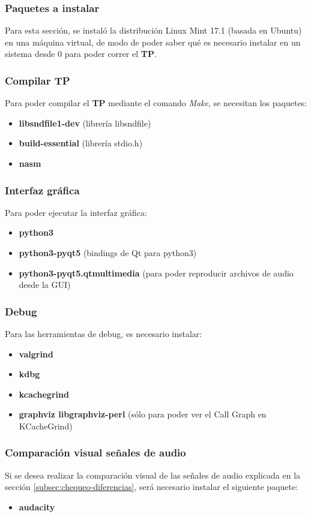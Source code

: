\subsubsection{Paquetes a instalar}
\label{subsec:instalar}
Para esta sección, se instaló la distribución Linux Mint 17.1 (basada en Ubuntu) en una máquina virtual, de modo de poder saber qué es necesario instalar en un sistema desde 0 para poder correr el \textbf{TP}.

\subsubsection*{Compilar TP}
Para poder compilar el \textbf{TP} mediante el comando \textit{Make}, se necesitan los paquetes: 
\begin{itemize}
 \item \textbf{libsndfile1-dev} (librería libsndfile)
 \item \textbf{build-essential} (librería stdio.h)
 \item \textbf{nasm}
\end{itemize}

\subsubsection*{Interfaz gráfica}
Para poder ejecutar la interfaz gráfica:
\begin{itemize}
 \item \textbf{python3}
 \item \textbf{python3-pyqt5} (bindings de Qt para python3)
 \item \textbf{python3-pyqt5.qtmultimedia} (para poder reproducir archivos de audio desde la GUI)
\end{itemize}

\subsubsection*{Debug}
Para las herramientas de debug, es necesario instalar:
\begin{itemize}
 \item \textbf{valgrind}
 \item \textbf{kdbg}
 \item \textbf{kcachegrind}
 \item \textbf{graphviz libgraphviz-perl} (sólo para poder ver el Call Graph en KCacheGrind)
\end{itemize}

\subsubsection*{Comparación visual señales de audio}
Si se desea realizar la comparación visual de las señales de audio explicada en la sección \ref{subsec:chequeo-diferencias}, será necesario instalar el siguiente paquete:
\begin{itemize}
 \item \textbf{audacity}
\end{itemize}